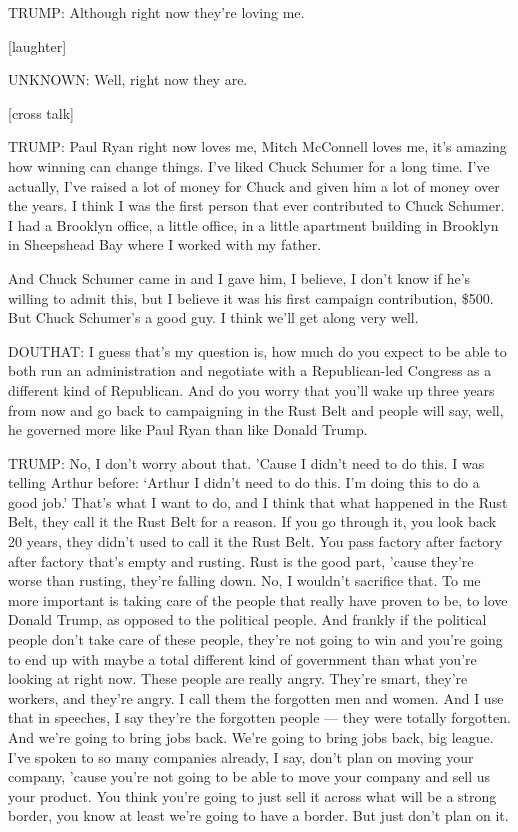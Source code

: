 TRUMP: Although right now they're loving me.

{[}laughter{]}

UNKNOWN: Well, right now they are.

{[}cross talk{]}

TRUMP: Paul Ryan right now loves me, Mitch McConnell loves me, it's
amazing how winning can change things. I've liked Chuck Schumer for a
long time. I've actually, I've raised a lot of money for Chuck and given
him a lot of money over the years. I think I was the first person that
ever contributed to Chuck Schumer. I had a Brooklyn office, a little
office, in a little apartment building in Brooklyn in Sheepshead Bay
where I worked with my father.

And Chuck Schumer came in and I gave him, I believe, I don't know if
he's willing to admit this, but I believe it was his first campaign
contribution, \$500. But Chuck Schumer's a good guy. I think we'll get
along very well.

DOUTHAT: I guess that's my question is, how much do you expect to be
able to both run an administration and negotiate with a Republican-led
Congress as a different kind of Republican. And do you worry that you'll
wake up three years from now and go back to campaigning in the Rust Belt
and people will say, well, he governed more like Paul Ryan than like
Donald Trump.

TRUMP: No, I don't worry about that. 'Cause I didn't need to do this. I
was telling Arthur before: `Arthur I didn't need to do this. I'm doing
this to do a good job.' That's what I want to do, and I think that what
happened in the Rust Belt, they call it the Rust Belt for a reason. If
you go through it, you look back 20 years, they didn't used to call it
the Rust Belt. You pass factory after factory after factory that's empty
and rusting. Rust is the good part, 'cause they're worse than rusting,
they're falling down. No, I wouldn't sacrifice that. To me more
important is taking care of the people that really have proven to be, to
love Donald Trump, as opposed to the political people. And frankly if
the political people don't take care of these people, they're not going
to win and you're going to end up with maybe a total different kind of
government than what you're looking at right now. These people are
really angry. They're smart, they're workers, and they're angry. I call
them the forgotten men and women. And I use that in speeches, I say
they're the forgotten people --- they were totally forgotten. And we're
going to bring jobs back. We're going to bring jobs back, big league.
I've spoken to so many companies already, I say, don't plan on moving
your company, 'cause you're not going to be able to move your company
and sell us your product. You think you're going to just sell it across
what will be a strong border, you know at least we're going to have a
border. But just don't plan on it.


